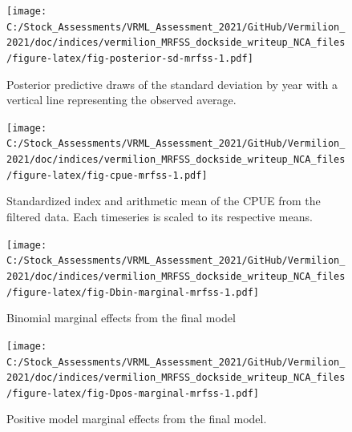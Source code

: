 \documentclass[11pt,
  english,
  a4paper,
]{article}
\begin{document}
\begin{figure}
\centering
\texttt{[image: C:/Stock\_Assessments/VRML\_Assessment\_2021/GitHub/Vermilion\_2021/doc/indices/vermilion\_MRFSS\_dockside\_writeup\_NCA\_files/figure-latex/fig-posterior-sd-mrfss-1.pdf]}
\caption{\label{fig:fig-posterior-sd-mrfss}Posterior predictive draws of the standard deviation by year with a vertical line representing the observed average.}
\end{figure}

\begin{figure}
\centering
\texttt{[image: C:/Stock\_Assessments/VRML\_Assessment\_2021/GitHub/Vermilion\_2021/doc/indices/vermilion\_MRFSS\_dockside\_writeup\_NCA\_files/figure-latex/fig-cpue-mrfss-1.pdf]}
\caption{\label{fig:fig-cpue-mrfss}Standardized index and arithmetic mean of the CPUE from the filtered data. Each timeseries is scaled to its respective means.}
\end{figure}

\begin{figure}
\centering
\texttt{[image: C:/Stock\_Assessments/VRML\_Assessment\_2021/GitHub/Vermilion\_2021/doc/indices/vermilion\_MRFSS\_dockside\_writeup\_NCA\_files/figure-latex/fig-Dbin-marginal-mrfss-1.pdf]}
\caption{\label{fig:fig-Dbin-marginal-mrfss}Binomial marginal effects from the final model}
\end{figure}

\begin{figure}
\centering
\texttt{[image: C:/Stock\_Assessments/VRML\_Assessment\_2021/GitHub/Vermilion\_2021/doc/indices/vermilion\_MRFSS\_dockside\_writeup\_NCA\_files/figure-latex/fig-Dpos-marginal-mrfss-1.pdf]}
\caption{\label{fig:fig-Dpos-marginal-mrfss}Positive model marginal effects from the final model.}
\end{figure}
\end{document}
